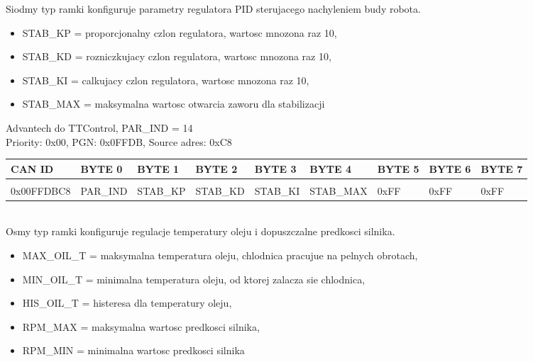 \documentclass{article}
\begin{document}
Siodmy typ ramki konfiguruje parametry regulatora PID sterujacego nachyleniem budy robota.

\begin{itemize}
    \item STAB\_KP  = proporcjonalny czlon regulatora, wartosc mnozona raz 10,
    \item STAB\_KD  = rozniczkujacy czlon regulatora, wartosc mnozona raz 10,
    \item STAB\_KI  = calkujacy czlon regulatora, wartosc mnozona raz 10,
    \item STAB\_MAX  = maksymalna wartosc otwarcia zaworu dla stabilizacji 
\end{itemize}

Advantech do TTControl, PAR\_IND = 14\\
Priority: 0x00, PGN: 0x0FFDB, Source adres: 0xC8 \\
\begin{left}
\begin{tabular}{ |p{2cm}|p{1.35cm}|p{1.5cm}|p{1.45cm}|p{1.40cm}|p{1.7cm}|p{1.2cm}|p{1.2cm}|p{1.2cm}|} 
 \hline
 CAN ID & BYTE 0 & BYTE 1 & BYTE 2 & BYTE 3 & BYTE 4 & BYTE 5 & BYTE 6 & BYTE 7 \\ \hline
 & & & & & & & &\\
0x00FFDBC8 & PAR\_IND & STAB\_KP & STAB\_KD & STAB\_KI & STAB\_MAX & 0xFF & 0xFF & 0xFF \\
 \hline
\end{tabular}
\end{left}\\

Osmy typ ramki konfiguruje regulacje temperatury oleju i dopuszczalne predkosci silnika.
\begin{itemize}
    \item MAX\_OIL\_T = maksymalna temperatura oleju, chlodnica pracujue na pelnych obrotach,
    \item MIN\_OIL\_T = minimalna temperatura oleju, od ktorej zalacza sie chlodnica,
    \item HIS\_OIL\_T = histeresa dla temperatury oleju,
    \item RPM\_MAX  = maksymalna wartosc predkosci silnika,
    \item RPM\_MIN  = minimalna wartosc predkosci silnika
\end{itemize}
\end{document}
